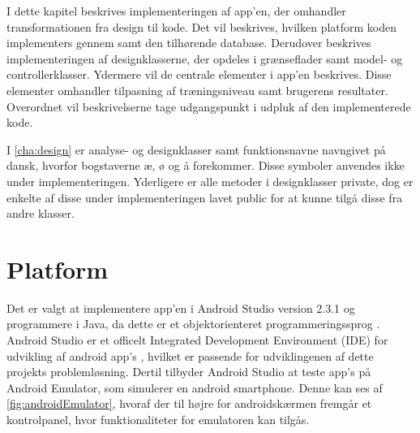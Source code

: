 I dette kapitel beskrives implementeringen af app'en, der omhandler transformationen fra design til kode. Det vil beskrives, hvilken platform koden implementers gennem samt den tilhørende database. Derudover beskrives implementeringen af designklasserne, der opdeles i grænseflader samt model- og controllerklasser. Ydermere vil de centrale elementer i app'en beskrives. Disse elementer omhandler tilpasning af træningsniveau samt brugerens resultater. Overordnet vil beskrivelserne tage udgangspunkt i udpluk af den implementerede kode.

I \autoref{cha:design} er analyse- og designklasser samt funktionsnavne navngivet på dansk, hvorfor bogstaverne æ, ø og å forekommer. Disse symboler anvendes ikke under implementeringen. Yderligere er alle metoder i designklasser private, dog er enkelte af disse under implementeringen lavet public for at kunne tilgå disse fra andre klasser. 

\section{Platform}
Det er valgt at implementere app'en i Android Studio version 2.3.1 og programmere i Java, da dette er et objektorienteret programmeringssprog \cite{Brahma2015}. Android Studio er et officelt Integrated Development Environment (IDE) for udvikling af android app's \cite{android2017}, hvilket er passende for udviklingenen af dette projekts problemløsning. Dertil tilbyder Android Studio at teste app's på Android Emulator, som simulerer en android smartphone. Denne kan ses af \autoref{fig:androidEmulator}, hvoraf der til højre for androidskærmen fremgår et kontrolpanel, hvor funktionaliteter for emulatoren kan tilgås. 

